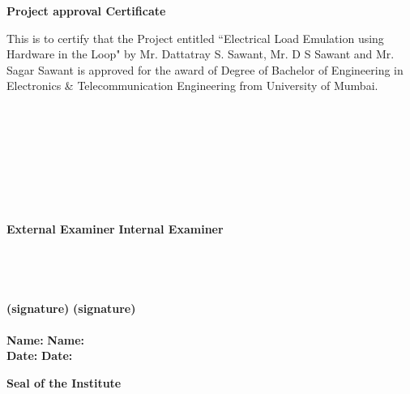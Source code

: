 \newpage
\thispagestyle{empty}
\vspace*{0.2cm}
\vspace{1cm}
\begin{center}
 \large\textbf{Project approval Certificate}
\end{center}
\vspace{2cm}
This is to certify that the Project entitled ``Electrical Load Emulation using Hardware in the Loop" by Mr. Dattatray S. Sawant, Mr. D S Sawant and Mr. Sagar Sawant is approved  for the award of Degree of Bachelor of Engineering in Electronics \& Telecommunication Engineering from University of Mumbai.\\
\\
\\
\\
\\
\\
\\
\\
\\
\textbf {External Examiner} \hspace{2.85in} \textbf{Internal Examiner}\\ 
\\
\\
\\
\\
\textbf {(signature)} \hspace{3.5in} \textbf{(signature)} \\
\\
\vspace{1cm}
\textbf {Name:} \hspace{3.8in} \textbf{Name:}\\ 
\vspace{2cm}
\textbf {Date:} \hspace{3.9in} \textbf{Date:}\\ 
\vspace{2cm}
\begin{center}
\textbf{Seal of the Institute}\\
\end{center}

